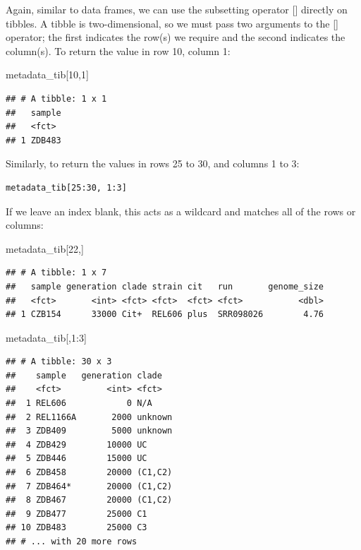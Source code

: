 \documentclass[
]{book}
\newenvironment{Shaded}{\begin{snugshade}}{\end{snugshade}}
\newcommand{\DecValTok}[1]{\textcolor[rgb]{0.00,0.00,0.81}{#1}}
\newcommand{\NormalTok}[1]{#1}
\newcommand{\SpecialCharTok}[1]{\textcolor[rgb]{0.00,0.00,0.00}{#1}}
\begin{document}
Again, similar to data frames, we can use the subsetting operator {[}{]} directly on tibbles. A tibble is two-dimensional, so we must pass two arguments to the {[}{]} operator; the first indicates the row(s) we require and the second indicates the column(s). To return the value in row 10, column 1:

\begin{Shaded}
\begin{Highlighting}[]
\NormalTok{metadata\_tib[}\DecValTok{10}\NormalTok{,}\DecValTok{1}\NormalTok{]}
\end{Highlighting}
\end{Shaded}

\begin{verbatim}
## # A tibble: 1 x 1
##   sample
##   <fct> 
## 1 ZDB483
\end{verbatim}

Similarly, to return the values in rows 25 to 30, and columns 1 to 3:

\begin{verbatim}
metadata_tib[25:30, 1:3]
\end{verbatim}

If we leave an index blank, this acts as a wildcard and matches all of the rows or columns:

\begin{Shaded}
\begin{Highlighting}[]
\NormalTok{metadata\_tib[}\DecValTok{22}\NormalTok{,]}
\end{Highlighting}
\end{Shaded}

\begin{verbatim}
## # A tibble: 1 x 7
##   sample generation clade strain cit   run       genome_size
##   <fct>       <int> <fct> <fct>  <fct> <fct>           <dbl>
## 1 CZB154      33000 Cit+  REL606 plus  SRR098026        4.76
\end{verbatim}

\begin{Shaded}
\begin{Highlighting}[]
\NormalTok{metadata\_tib[,}\DecValTok{1}\SpecialCharTok{:}\DecValTok{3}\NormalTok{]}
\end{Highlighting}
\end{Shaded}

\begin{verbatim}
## # A tibble: 30 x 3
##    sample   generation clade  
##    <fct>         <int> <fct>  
##  1 REL606            0 N/A    
##  2 REL1166A       2000 unknown
##  3 ZDB409         5000 unknown
##  4 ZDB429        10000 UC     
##  5 ZDB446        15000 UC     
##  6 ZDB458        20000 (C1,C2)
##  7 ZDB464*       20000 (C1,C2)
##  8 ZDB467        20000 (C1,C2)
##  9 ZDB477        25000 C1     
## 10 ZDB483        25000 C3     
## # ... with 20 more rows
\end{verbatim}
\end{document}

